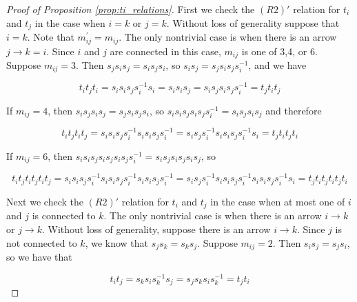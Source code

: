 \documentclass[11pt]{amsart}
\theoremstyle{definition}
\begin{document}
\begin{proof}[Proof of Proposition \ref{prop:ti_relations}]
First we check the $(R2)'$ relation for $t_i$ and $t_j$ in the case when $i=k$ or $j=k$.  Without loss of generality suppose that $i=k$.  Note that $m_{ij}^\prime = m_{ij}$. The only nontrivial case is when there is an arrow $j\rightarrow k =i$.   Since $i$ and $j$ are connected in this case, $m_{ij}$ is one of 3,4, or 6.  Suppose $m_{ij} = 3$.  Then $s_js_is_j = s_is_js_i$, so $s_is_j = s_js_is_js_i^{-1}$, and we have

$$t_it_jt_i = s_is_is_js_i^{-1}s_i = s_is_is_j = s_is_js_is_js_i^{-1} = t_jt_it_j$$

\noindent If $m_{ij} = 4$, then $s_is_js_is_j = s_js_is_js_i$, so $s_is_is_js_is_js_i^{-1} = s_is_js_is_j$ and therefore

$$t_it_jt_it_j = s_is_is_js_i^{-1}s_is_is_js_i^{-1} = s_is_js_i^{-1}s_is_is_js_i^{-1}s_i = t_jt_it_jt_i$$


\noindent If $m_{ij} = 6$, then $s_is_is_js_is_js_is_js_i^{-1} = s_is_js_is_js_is_j$, so 

$$t_it_jt_it_jt_it_j = s_is_is_js_i^{-1}s_is_is_js_i^{-1}s_is_is_js_i^{-1} = s_is_js_i^{-1}s_is_is_js_i^{-1}s_is_is_js_i^{-1}s_i = t_jt_it_jt_it_jt_i$$


Next we check the $(R2)'$ relation for $t_i$ and $t_j$ in the case when at most one of $i$ and $j$ is connected to $k$.  The only nontrivial case is when there is an arrow $i\rightarrow k$ or $j\rightarrow k$.  Without loss of generality, suppose there is an arrow $i\rightarrow k$.  Since $j$ is not connected to $k$, we know that $s_js_k = s_ks_j$.  Suppose $m_{ij} = 2$.  Then $s_is_j = s_js_i$, so we have that

$$t_it_j = s_ks_is_k^{-1}s_j = s_js_ks_is_k^{-1} = t_jt_i$$


\end{proof}
\end{document}
